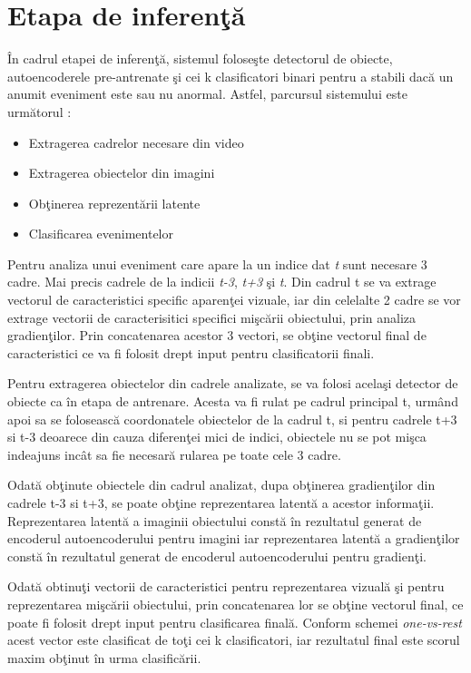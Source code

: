 \documentclass[a4paper,12pt]{report}
\begin{document}
\section{Etapa de inferenţă}
\quad În cadrul etapei de inferenţă, sistemul foloseşte detectorul de obiecte, autoencoderele pre-antrenate şi cei k clasificatori binari pentru a stabili dacă un anumit eveniment este sau nu anormal. Astfel, parcursul sistemului este următorul :
\begin{itemize}
\item Extragerea cadrelor necesare din video
\item Extragerea obiectelor din imagini
\item Obţinerea reprezentării latente
\item Clasificarea evenimentelor
\end{itemize}
\par
Pentru analiza unui eveniment care apare la un indice dat \emph{t} sunt necesare 3 cadre. Mai precis cadrele de la indicii \emph{t-3}, \emph{t+3} şi \emph{t}.
Din cadrul t se va extrage vectorul de caracteristici specific aparenţei vizuale, iar din celelalte 2 cadre se vor extrage vectorii de caracterisitici specifici mişcării obiectului, prin analiza gradienţilor. Prin concatenarea acestor 3 vectori, se obţine vectorul final de caracteristici ce va fi folosit drept input pentru clasificatorii finali.
\par
Pentru extragerea obiectelor din cadrele analizate, se va folosi acelaşi detector de obiecte ca în etapa de antrenare.  Acesta va fi rulat pe cadrul principal t, urmând apoi sa se folosească coordonatele obiectelor de la cadrul t, si pentru cadrele t+3 si t-3 deoarece din cauza diferenţei mici de indici, obiectele nu se pot mişca indeajuns incât sa fie necesară rularea pe toate cele 3 cadre.
\par
Odată obţinute obiectele din cadrul analizat, dupa obţinerea gradienţilor din cadrele t-3 si t+3, se poate obţine reprezentarea latentă a acestor informaţii.
Reprezentarea latentă a imaginii obiectului constă în rezultatul generat de encoderul autoencoderului pentru imagini iar reprezentarea latentă a gradienţilor constă în rezultatul generat de encoderul autoencoderului pentru gradienţi.
\par
Odată obtinuţi vectorii de caracteristici pentru reprezentarea vizuală şi pentru reprezentarea mişcării obiectului, prin concatenarea lor se obţine vectorul final, ce poate fi folosit drept input pentru clasificarea finală. Conform schemei \emph{one-vs-rest} acest vector este clasificat de toţi cei k clasificatori, iar rezultatul final este scorul maxim obţinut în urma clasificării.
\end{document}
